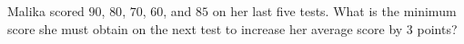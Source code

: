 Malika scored $90$, $80$, $70$, $60$, and $85$ on her last five tests. What is the minimum score she must obtain on the next test to increase her average score by $3$ points?
